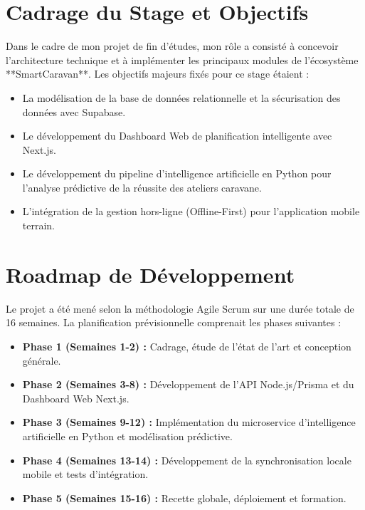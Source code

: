 \documentclass[12pt,a4paper]{report}
\begin{document}
\section{Cadrage du Stage et Objectifs}
Dans le cadre de mon projet de fin d'études, mon rôle a consisté à concevoir l'architecture technique et à implémenter les principaux modules de l'écosystème **SmartCaravan**.
Les objectifs majeurs fixés pour ce stage étaient :
\begin{itemize}
    \item La modélisation de la base de données relationnelle et la sécurisation des données avec Supabase.
    \item Le développement du Dashboard Web de planification intelligente avec Next.js.
    \item Le développement du pipeline d'intelligence artificielle en Python pour l'analyse prédictive de la réussite des ateliers caravane.
    \item L'intégration de la gestion hors-ligne (Offline-First) pour l'application mobile terrain.
\end{itemize}

\section{Roadmap de Développement}
Le projet a été mené selon la méthodologie Agile Scrum sur une durée totale de 16 semaines. La planification prévisionnelle comprenait les phases suivantes :
\begin{itemize}
    \item \textbf{Phase 1 (Semaines 1-2) :} Cadrage, étude de l'état de l'art et conception générale.
    \item \textbf{Phase 2 (Semaines 3-8) :} Développement de l'API Node.js/Prisma et du Dashboard Web Next.js.
    \item \textbf{Phase 3 (Semaines 9-12) :} Implémentation du microservice d'intelligence artificielle en Python et modélisation prédictive.
    \item \textbf{Phase 4 (Semaines 13-14) :} Développement de la synchronisation locale mobile et tests d'intégration.
    \item \textbf{Phase 5 (Semaines 15-16) :} Recette globale, déploiement et formation.
\end{itemize}

\end{document}
